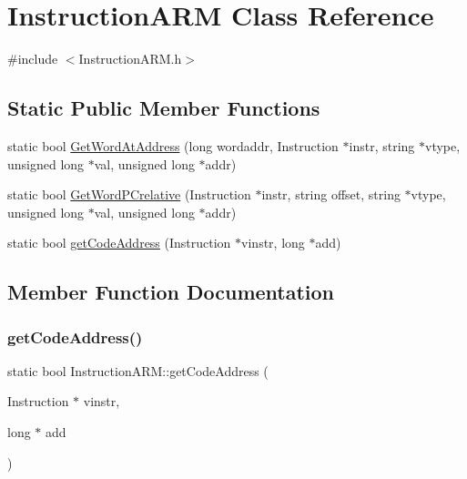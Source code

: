 \hypertarget{classInstructionARM}{}\section{Instruction\+A\+RM Class Reference}
\label{classInstructionARM}


{\ttfamily \#include $<$Instruction\+A\+R\+M.\+h$>$}

\subsection*{Static Public Member Functions}
\begin{DoxyCompactItemize}
\item 
static bool \hyperlink{classInstructionARM_ae9c5e0e9a1eebec1a25d5c444f99565c}{Get\+Word\+At\+Address} (long wordaddr, Instruction $\ast$instr, string $\ast$vtype, unsigned long $\ast$val, unsigned long $\ast$addr)
\item 
static bool \hyperlink{classInstructionARM_a9a2b36b492279f08bf57170e91a49e03}{Get\+Word\+P\+Crelative} (Instruction $\ast$instr, string offset, string $\ast$vtype, unsigned long $\ast$val, unsigned long $\ast$addr)
\item 
static bool \hyperlink{classInstructionARM_a5874075c24ed82b641693a9c060aba6e}{get\+Code\+Address} (Instruction $\ast$vinstr, long $\ast$add)
\end{DoxyCompactItemize}


\subsection{Member Function Documentation}
\mbox{\label{classInstructionARM_a5874075c24ed82b641693a9c060aba6e}} 
\subsubsection{\texorpdfstring{get\+Code\+Address()}{getCodeAddress()}}
{\footnotesize\ttfamily static bool Instruction\+A\+R\+M\+::get\+Code\+Address (\begin{DoxyParamCaption}\item[{Instruction $\ast$}]{vinstr,  }\item[{long $\ast$}]{add }\end{DoxyParamCaption})\hspace{0.3cm}{\ttfamily [static]}}

